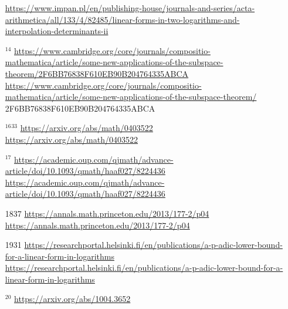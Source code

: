 \documentclass[10pt]{article}
\begin{document}
\begin{itemize}
\href{https://www.impan.pl/en/publishing-house/journals-and-series/acta-arithmetica/all/133/4/82485/linear-forms-in-two-logarithms-and-interpolation-determinants-ii}{https://www.impan.pl/en/publishing-house/journals-and-series/acta-arithmetica/all/133/4/82485/linear-forms-in-two-logarithms-and-interpolation-determinants-ii}
  \item[] ${ }^{14}$ \href{https://www.cambridge.org/core/journals/compositio-mathematica/article/some-new-applications-of-the-subspace-theorem/2F6BB76838F610EB90B204764335ABCA}{https://www.cambridge.org/core/journals/compositio-mathematica/article/some-new-applications-of-the-subspace-theorem/2F6BB76838F610EB90B204764335ABCA}\\
\href{https://www.cambridge.org/core/journals/compositio-mathematica/article/some-new-applications-of-the-subspace-theorem/}{https://www.cambridge.org/core/journals/compositio-mathematica/article/some-new-applications-of-the-subspace-theorem/} 2F6BB76838F610EB90B204764335ABCA
  \item[] ${ }^{16}{ }^{33}$ \href{https://arxiv.org/abs/math/0403522}{https://arxiv.org/abs/math/0403522}\\
\href{https://arxiv.org/abs/math/0403522}{https://arxiv.org/abs/math/0403522}
  \item[] ${ }^{17}$ \href{https://academic.oup.com/qjmath/advance-article/doi/10.1093/qmath/haaf027/8224436}{https://academic.oup.com/qjmath/advance-article/doi/10.1093/qmath/haaf027/8224436}\\
\href{https://academic.oup.com/qjmath/advance-article/doi/10.1093/qmath/haaf027/8224436}{https://academic.oup.com/qjmath/advance-article/doi/10.1093/qmath/haaf027/8224436}
  \item[1837] \href{https://annals.math.princeton.edu/2013/177-2/p04}{https://annals.math.princeton.edu/2013/177-2/p04}\\
\href{https://annals.math.princeton.edu/2013/177-2/p04}{https://annals.math.princeton.edu/2013/177-2/p04}
  \item[1931] \href{https://researchportal.helsinki.fi/en/publications/a-p-adic-lower-bound-for-a-linear-form-in-logarithms}{https://researchportal.helsinki.fi/en/publications/a-p-adic-lower-bound-for-a-linear-form-in-logarithms}\\
\href{https://researchportal.helsinki.fi/en/publications/a-p-adic-lower-bound-for-a-linear-form-in-logarithms}{https://researchportal.helsinki.fi/en/publications/a-p-adic-lower-bound-for-a-linear-form-in-logarithms}
  \item[] ${ }^{20}$ \href{https://arxiv.org/abs/1004.3652}{https://arxiv.org/abs/1004.3652}\\

\end{itemize}
\end{document}
